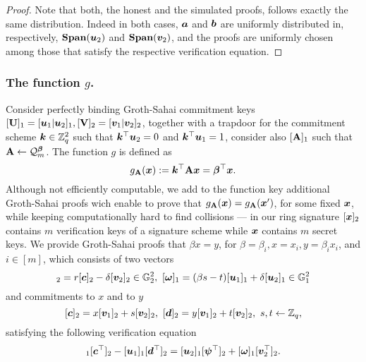 \begin{proof}
Note that both, the honest and the simulated proofs, follows exactly the same distribution. Indeed in both cases, ${\boldsymbol{a}}$ and ${\boldsymbol{b}}$ are uniformly distributed in, respectively, $\mathbf{Span}({\boldsymbol{u}}_2)$ and $\mathbf{Span}({\boldsymbol{v}}_2)$, and the proofs are uniformly chosen among those that satisfy the respective verification equation.
\end{proof} 

\subsubsection{The function $g$.} Consider perfectly binding Groth-Sahai commitment keys $[\mathbf{{U}}]_1=[{\boldsymbol{u}}_1|{\boldsymbol{u}}_2]_1,[\mathbf{{V}}]_2 = [{\boldsymbol{v}}_1|{\boldsymbol{v}}_2]_2$, together with a trapdoor for the commitment scheme ${\boldsymbol{k}}\in\mathbb{Z}_q^2$ such that ${\boldsymbol{k}}^\top{\boldsymbol{u}}_2=0$ and ${\boldsymbol{k}}^\top{\boldsymbol{u}}_1=1$, consider also $[\mathbf{{A}}]_1$ such that $\mathbf{{A}}\gets\mathcal{Q}_m^{\boldsymbol{\beta}}$. The function $g$ is defined as
$$
g_{\mathbf{{A}}}({\boldsymbol{x}}):= {\boldsymbol{k}}^\top\mathbf{{A}}{\boldsymbol{x}}={\boldsymbol{\beta}}^\top{\boldsymbol{x}}.
$$
Although not efficiently computable, we add to the function key additional Groth-Sahai proofs wich enable to prove that
 $g_{\mathbf{{A}}}({\boldsymbol{x}}) = g_{\mathbf{{A}}}({\boldsymbol{x}}')$, for some fixed ${\boldsymbol{x}}$, while keeping computationally hard to find collisions --- in our ring signature $[{\boldsymbol{x}}]_2$ contains $m$ verification keys of a signature scheme while ${\boldsymbol{x}}$ contains $m$ secret keys.
We provide Groth-Sahai proofs that $\beta x=y$, for $\beta=\beta_i,x=x_i,y=\beta_ix_i$, and $i\in[m]$, which consists of two vectors
\begin{equation}
[\vecb{\psi}]_2=r[\vecb{c}]_2-\delta[\vecb{v}_2]_2\in\GG_2^2,\ [\vecb{\omega}]_1 =(\beta s-t)[\vecb{u}_1]_1+\delta[\vecb{u}_2]_1\in\GG_1^2
\label{eq:wi-proofs}
\end{equation}
and commitments to $x$ and to $y$
$$
[{\boldsymbol{c}}]_2= x[{\boldsymbol{v}}_1]_2+s[{\boldsymbol{v}}_2]_2,\ [{\boldsymbol{d}}]_2 =y[{\boldsymbol{v}}_1]_2 + t[{\boldsymbol{v}}_2]_2,\ s,t\gets\mathbb{Z}_q,
$$
satisfying the following verification equation
\begin{equation}
[\vecb{a}]_1[\vecb{c}^\top]_2-[\vecb{u}_1]_1[\vecb{d}^\top]_2 =[\vecb{u}_2]_1[\vecb{\psi}^\top]_2+[\vecb{\omega}]_1[\vecb{v}^\top_2]_2.
\label{eq:wi-verif}
\end{equation}


